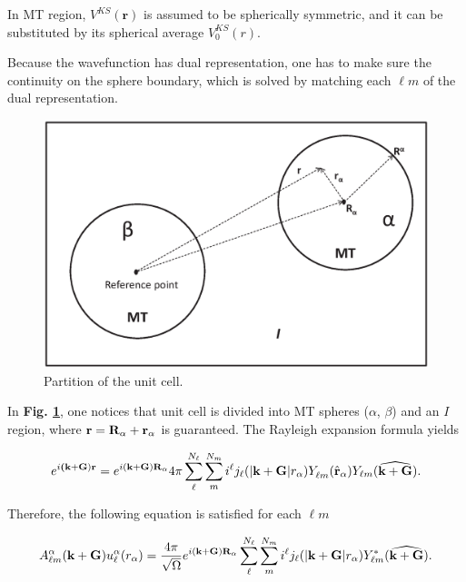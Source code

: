 \documentclass[a4paper, 12pt, titlepage,oneside,drop]{kthesis}
\begin{document}
In MT region, $V^{KS}(\textbf{r})$ is assumed to be spherically symmetric, and it can be substituted by its spherical average $V^{KS}_0({r})$.

Because the wavefunction has dual representation, one has to make sure the continuity on the sphere boundary, which is solved by matching each $\ell m$
of the dual representation.

\begin{figure}[h]
\begin{center}
\includegraphics[scale=0.5]{unitcell.eps}
\caption{Partition of the unit cell.}
\label{ucuc}
\end{center}
\end{figure}

In \textbf{Fig. \ref{ucuc}}, one notices that unit cell is divided into MT spheres ($\alpha$, $\beta$) and an
$I$ region, where ${\textbf r = {\textbf R_{\alpha}}+{\textbf r_{\alpha}}}$ is guaranteed. The Rayleigh expansion formula yields

\begin{equation}
\expg<(\textbf {k}+\textbf{G})> = e^{i (\textbf {k}+\textbf{G}) \textbf{R}_{\alpha} } 4 \pi \sum\limits_{{\ell}}^{N_{\ell}} \sum\limits_{{m}}^{N_{m}} i^{\ell} \bessf< |\textbf{k}+\textbf{G}|> \sphfr<\ell{m}><r><> Y_{\ell{m}}(\widehat{\textbf{k}+\textbf{G}}).
\end{equation}
  
Therefore, the following equation is satisfied for each ${\ell}m$

\begin{equation}
A _{{\ell}m}^{\alpha} (\textbf {k}+\textbf{G})  u_{{\ell}}^{\alpha}(r_{\alpha})=  \frac{4 \pi }{\sqrt{\Omega}} e^{i (\textbf {k}+\textbf{G}) \textbf{R}_{\alpha} }  \sum\limits_{{\ell}}^{N_{\ell}} \sum\limits_{{m}}^{N_{m}} i^{\ell} \bessf< |\textbf{k}+\textbf{G}|> Y^{*}_{\ell{m}}(\widehat{\textbf{k}+\textbf{G}}).
\end{equation}
\end{document}
